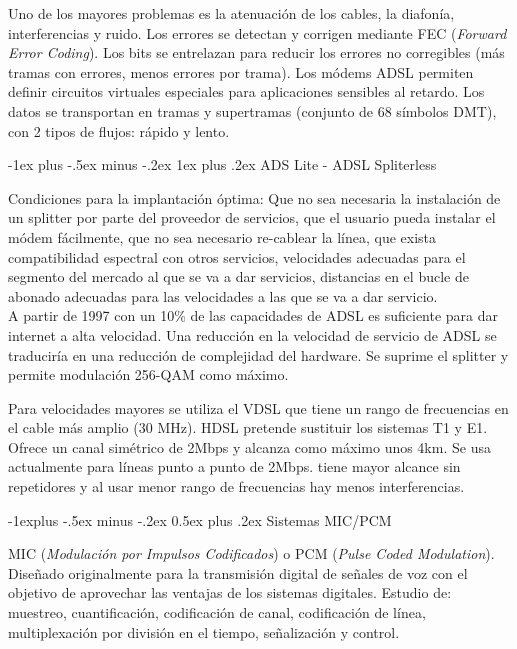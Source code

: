 \documentclass[10pt,portrait, twocolumn]{article}
\makeatletter
\renewcommand{\subsection}{\@startsection{subsection}{2}{0mm}%
                                {-1explus -.5ex minus -.2ex}%
                                {0.5ex plus .2ex}%
                                {\normalfont\normalsize\bfseries}}
\renewcommand{\subsubsection}{\@startsection{subsubsection}{3}{0mm}%
                                {-1ex plus -.5ex minus -.2ex}%
                                {1ex plus .2ex}%
                                {\normalfont\small\bfseries}}
\makeatother
\begin{document}
Uno de los mayores problemas es la atenuación de los cables, la diafonía, interferencias y ruido. Los errores se detectan y corrigen mediante FEC (\textit{Forward Error Coding}). Los bits se entrelazan para reducir los errores no corregibles (más tramas con errores, menos errores por trama). Los módems ADSL permiten definir circuitos virtuales especiales para aplicaciones sensibles al retardo. Los datos se transportan en tramas y supertramas (conjunto de 68 símbolos DMT), con 2 tipos de flujos: rápido y lento.

\subsubsection{ADS Lite - ADSL Spliterless}

Condiciones para la implantación óptima: Que no sea necesaria la instalación de un splitter por parte del proveedor de servicios, que el usuario pueda instalar el módem fácilmente, que no sea necesario re-cablear la línea, que exista compatibilidad espectral con otros servicios, velocidades adecuadas para el segmento del mercado al que se va a dar servicios, distancias en el bucle de abonado adecuadas para las velocidades a las que se va a dar servicio.\\

A partir de 1997 con un 10\% de las capacidades de ADSL es suficiente para dar internet a alta velocidad. Una reducción en la velocidad de servicio de ADSL se traduciría en una reducción de complejidad del hardware. Se suprime el splitter y permite modulación 256-QAM como máximo.

Para velocidades mayores se utiliza el VDSL que tiene un rango de frecuencias en el cable más amplio (30 MHz). HDSL pretende sustituir los sistemas T1 y E1. Ofrece un canal simétrico de 2Mbps y alcanza como máximo unos 4km. Se usa actualmente para líneas punto a punto de 2Mbps. tiene mayor alcance sin repetidores y al usar menor rango de frecuencias hay menos interferencias.

\hrulefill

\subsection{Sistemas MIC/PCM}

MIC (\textit{Modulación por Impulsos Codificados}) o PCM (\textit{Pulse Coded Modulation}). Diseñado originalmente para la transmisión digital de señales de voz con el objetivo de aprovechar las ventajas de los sistemas digitales. Estudio de: muestreo, cuantificación, codificación de canal, codificación de línea, multiplexación por división en el tiempo, señalización y control.
\end{document}
